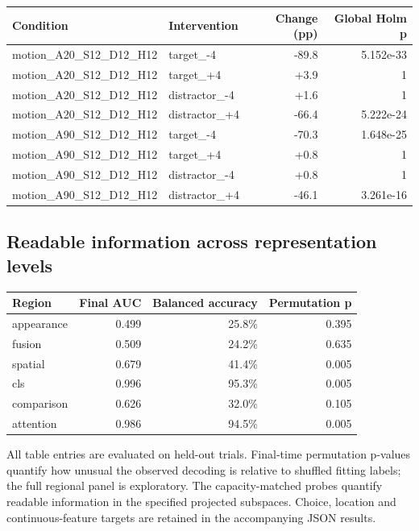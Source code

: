 \documentclass[11pt]{article}
\begin{document}
\small\begin{longtable}{p{}p{}rr}\toprule Condition & Intervention & Change (pp) & Global Holm p\\\midrule\endhead
motion\_\allowbreak{}A20\_\allowbreak{}S12\_\allowbreak{}D12\_\allowbreak{}H12 & target\_\allowbreak{}-4 & -89.8 & 5.152e-33\\
motion\_\allowbreak{}A20\_\allowbreak{}S12\_\allowbreak{}D12\_\allowbreak{}H12 & target\_\allowbreak{}+4 & +3.9 & 1\\
motion\_\allowbreak{}A20\_\allowbreak{}S12\_\allowbreak{}D12\_\allowbreak{}H12 & distractor\_\allowbreak{}-4 & +1.6 & 1\\
motion\_\allowbreak{}A20\_\allowbreak{}S12\_\allowbreak{}D12\_\allowbreak{}H12 & distractor\_\allowbreak{}+4 & -66.4 & 5.222e-24\\
motion\_\allowbreak{}A90\_\allowbreak{}S12\_\allowbreak{}D12\_\allowbreak{}H12 & target\_\allowbreak{}-4 & -70.3 & 1.648e-25\\
motion\_\allowbreak{}A90\_\allowbreak{}S12\_\allowbreak{}D12\_\allowbreak{}H12 & target\_\allowbreak{}+4 & +0.8 & 1\\
motion\_\allowbreak{}A90\_\allowbreak{}S12\_\allowbreak{}D12\_\allowbreak{}H12 & distractor\_\allowbreak{}-4 & +0.8 & 1\\
motion\_\allowbreak{}A90\_\allowbreak{}S12\_\allowbreak{}D12\_\allowbreak{}H12 & distractor\_\allowbreak{}+4 & -46.1 & 3.261e-16\\
\bottomrule\end{longtable}\normalsize
\subsection{Readable information across representation levels}
\begin{center}\begin{tabular}{lrrr}\toprule Region & Final AUC & Balanced accuracy & Permutation p\\\midrule
appearance & 0.499 & 25.8\% & 0.395\\
fusion & 0.509 & 24.2\% & 0.635\\
spatial & 0.679 & 41.4\% & 0.005\\
cls & 0.996 & 95.3\% & 0.005\\
comparison & 0.626 & 32.0\% & 0.105\\
attention & 0.986 & 94.5\% & 0.005\\
\bottomrule\end{tabular}\end{center}
All table entries are evaluated on held-out trials. Final-time permutation p-values quantify how unusual the observed decoding is relative to shuffled fitting labels; the full regional panel is exploratory. The capacity-matched probes quantify readable information in the specified projected subspaces. Choice, location and continuous-feature targets are retained in the accompanying JSON results.
\end{document}
